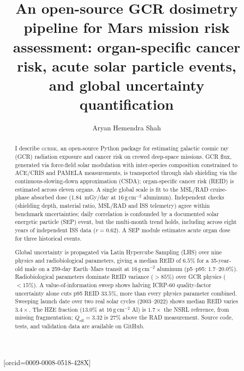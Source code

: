 \documentclass[a4paper,fleqn]{cas-dc}
\newcommand{\gcm}{\,\mathrm{g\,cm^{-2}}}
\newcommand{\Qeff}{Q_\mathrm{eff}}
\begin{document}
\let\WriteBookmarks\relax
\def\floatpagepagefraction{1}
\def\textpagefraction{.001}


\title[mode=title]{An open-source GCR dosimetry pipeline for Mars mission
risk assessment: organ-specific cancer risk, acute solar particle events,
and global uncertainty quantification}

\author[1]{Aryan Hemendra Shah}[orcid=0009-0008-0518-428X]
\cormark[1]



\begin{abstract}
I describe \textsc{gcrisk}, an open-source Python package
for estimating galactic cosmic ray (GCR) radiation exposure and cancer
risk on crewed deep-space missions. GCR flux, generated via force-field
solar modulation with inter-species composition constrained to ACE/CRIS
and PAMELA measurements, is transported through slab shielding via the
continuous-slowing-down approximation (CSDA); organ-specific cancer risk (REID)
is estimated across eleven organs. A single global scale is fit to the
MSL/RAD cruise-phase absorbed dose ($1.84$~mGy/day at $16\gcm$ aluminum).
Independent checks (shielding depth, material ratio, MSL/RAD
and ISS telemetry) agree within benchmark uncertainties; daily
correlation is confounded by a documented solar energetic particle (SEP)
event, but the multi-month trend holds, including across eight
years of independent ISS data ($r=0.62$). A SEP module
estimates acute organ dose for three historical events.

Global uncertainty is propagated via Latin Hypercube Sampling (LHS) over nine
physics and radiobiological parameters, giving a median REID of
$6.5\%$ for a 35-year-old male on a 259-day Earth--Mars transit at
$16\gcm$ aluminum (p5--p95: $1.7$--$20.0\%$). Radiobiological parameters
dominate REID variance ($>\!85\%$) over GCR physics ($<\!15\%$). A
value-of-information sweep shows halving ICRP-60 quality-factor
uncertainty alone cuts p95 REID $33.5\%$, more than every physics
parameter combined. Sweeping launch date over two real solar
cycles (2003--2022) shows median REID varies $3.4\times$. The HZE
fraction ($13.0\%$ at $16\gcm$ Al) is $1.7\times$ the NSRL reference,
from missing fragmentation; $\Qeff=3.32$ is $27\%$
above the RAD measurement.
Source code, tests, and validation data are available on GitHub.
\end{abstract}
\end{document}
